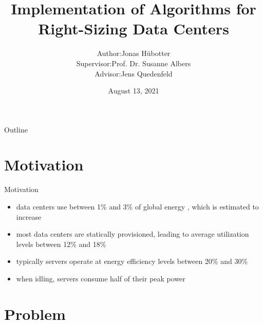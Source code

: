 \documentclass{beamer}
\begin{document}
\title[Implementation of Algorithms for Right-Sizing Data Centers]{Implementation of Algorithms for \\ Right-Sizing Data Centers}
\author{\begin{tabular}{r@{ }l}
Author:      & Jonas Hübotter \\[1ex]
Supervisor:  & Prof. Dr. Susanne Albers\\
Advisor:     & Jens Quedenfeld\\
\end{tabular}}
\date{August 13, 2021}

\begin{frame}
  \titlepage
\end{frame}

\begin{frame}{Outline}
 \tableofcontents[subsectionstyle=hide, subsubsectionstyle=hide]
\end{frame}

\section{Motivation}

\begin{frame}{Motivation}
    \begin{itemize}
        \item data centers use between 1\% and 3\% of global energy , which is estimated to increase\pause
        \item most data centers are statically provisioned, leading to average utilization levels between 12\% and 18\%\pause
        \item typically servers operate at energy efficiency levels between 20\% and 30\%\pause
        \item when idling, servers consume half of their peak power\footnotemark[\value{footnote}]
    \end{itemize}
\end{frame}

\section{Problem}
\end{document}
